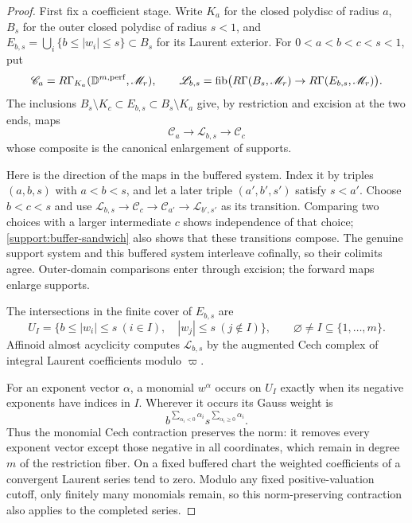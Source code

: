 \begin{proof}
First fix a coefficient stage.  Write $K_a$ for the closed
polydisc of radius $a$, $B_s$ for the outer closed polydisc of
radius $s<1$, and
$E_{b,s}=\bigcup_i\{b\leq|w_i|\leq s\}\subset B_s$ for its
Laurent exterior.  For $0<a<b<c<s<1$, put
\[
 \mathscr C_a=R\Gamma_{K_a}(\mathbb D^{m,\mathrm{perf}},\mathscr M_r),
 \qquad
 \mathscr L_{b,s}=\operatorname{fib}\bigl(R\Gamma(B_s,\mathscr M_r)
                    \to R\Gamma(E_{b,s},\mathscr M_r)\bigr).
\]
The inclusions
$B_s\setminus K_c\subset E_{b,s}\subset B_s\setminus K_a$
give, by restriction and excision at the two ends, maps
\begin{equation}\label{support:buffer-sandwich}
 \mathscr C_a\longrightarrow\mathscr L_{b,s}\longrightarrow\mathscr C_c
\end{equation}
whose composite is the canonical enlargement of supports.

Here is the direction of the maps in the buffered system.
Index it by triples $(a,b,s)$ with $a<b<s$, and let a later
triple $(a',b',s')$ satisfy $s<a'$.  Choose $b<c<s$ and use
$\mathscr L_{b,s}\to\mathscr C_c\to\mathscr C_{a'}
\to\mathscr L_{b',s'}$ as its transition.
Comparing two choices with a larger intermediate $c$ shows
independence of that choice; \eqref{support:buffer-sandwich}
also shows that these transitions compose.  The genuine support
system and this buffered system interleave cofinally, so their
colimits agree.  Outer-domain comparisons enter through excision;
the forward maps enlarge supports.

The intersections in the finite cover of $E_{b,s}$ are
\[
 U_I=\{b\leq|w_i|\leq s\ (i\in I),\quad
            |w_j|\leq s\ (j\notin I)\},
 \qquad \varnothing\ne I\subseteq\{1,\ldots,m\}.
\]
Affinoid almost acyclicity computes $\mathscr L_{b,s}$ by the augmented
Cech complex of integral Laurent coefficients modulo $\varpi$.

For an exponent vector $\alpha$, a monomial $w^\alpha$ occurs on
$U_I$ exactly when its negative exponents have indices in $I$.
Wherever it occurs its Gauss weight is
\[
 b^{\sum_{\alpha_i<0}\alpha_i}
 s^{\sum_{\alpha_i\geq0}\alpha_i}.
\]
Thus the monomial Cech contraction preserves the norm: it removes
every exponent vector except those negative in all coordinates,
which remain in degree $m$ of the restriction fiber.  On a fixed
buffered chart the weighted coefficients of a convergent Laurent
series tend to zero.  Modulo any fixed positive-valuation cutoff,
only finitely many monomials remain, so this norm-preserving
contraction also applies to the completed series.


\end{proof}
